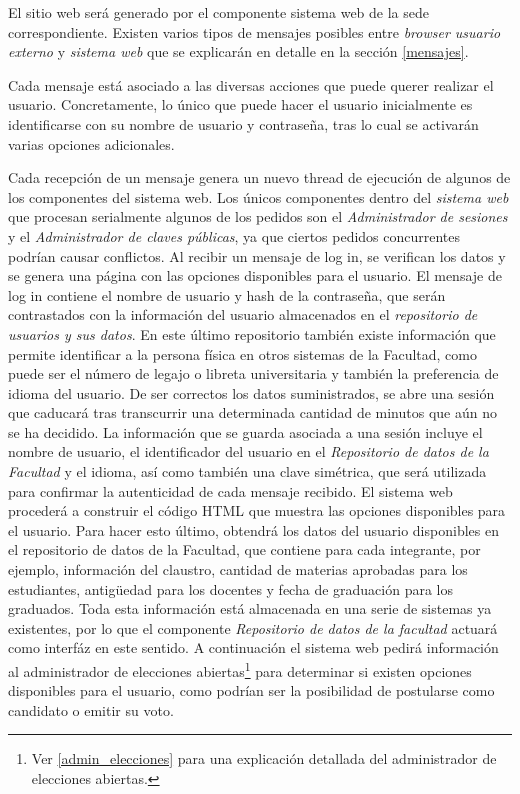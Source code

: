 El sitio web será generado por el componente sistema web de la sede correspondiente. Existen varios tipos de mensajes posibles entre \emph{browser usuario externo} y \emph{sistema web} que se explicarán en detalle en la sección \ref{mensajes}. 

Cada mensaje está asociado a las diversas acciones que puede querer realizar el usuario. Concretamente, lo único que puede hacer el usuario inicialmente es identificarse con su nombre de usuario y contraseña, tras lo cual se activarán varias opciones adicionales.


Cada recepción de un mensaje genera un nuevo thread de ejecución de algunos de los componentes del sistema web. Los únicos componentes dentro del \emph{sistema web} que procesan serialmente algunos de los pedidos son el  \emph{Administrador de sesiones} y el \emph{Administrador de claves públicas}, ya que ciertos pedidos concurrentes podrían causar conflictos.
Al recibir un mensaje de log in, se verifican los datos y se genera una página con las opciones disponibles para el usuario. 
El mensaje de log in contiene el nombre de usuario y hash de la contraseña, que serán contrastados con la información del usuario almacenados en el \emph{repositorio de usuarios y sus datos}. En este último repositorio también existe información que permite identificar a la persona física en otros sistemas de la Facultad, como puede ser el número de legajo o libreta universitaria y también la preferencia de idioma del usuario. 
De ser correctos los datos suministrados, se abre una sesión que caducará tras transcurrir una determinada cantidad de minutos que aún no se ha decidido.
La información que se guarda asociada a una sesión incluye el nombre de usuario, el identificador del usuario en el \emph{Repositorio de datos de la Facultad} y el idioma, así como también una clave simétrica, que será utilizada para confirmar la autenticidad de cada mensaje recibido.
El sistema web procederá a construir el código HTML que muestra las opciones disponibles para el usuario. Para hacer esto último, obtendrá los datos del usuario disponibles en el repositorio de datos de la Facultad, que contiene para cada integrante, por ejemplo, información del claustro, cantidad de materias aprobadas para los estudiantes, antigüedad para los docentes y fecha de graduación para los graduados. Toda esta información está almacenada en una serie de sistemas ya existentes, por lo que el componente \emph{Repositorio de datos de la facultad} actuará como interfáz en este sentido.
A continuación el sistema web pedirá información al administrador de elecciones abiertas\footnote{Ver \ref{admin_elecciones} para una explicación detallada del administrador de elecciones abiertas.} para determinar si existen opciones disponibles para el usuario, como podrían ser la posibilidad de postularse como candidato o emitir su voto.


